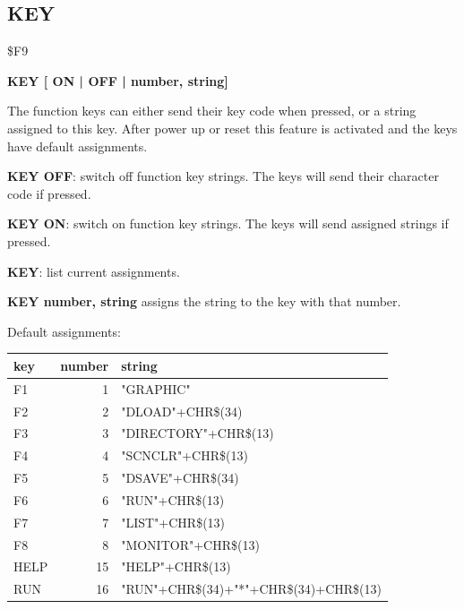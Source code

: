 \subsection{KEY}
\begin{description}[leftmargin=2cm,style=nextline]
\item [Token:] \$F9
\item [Format:] {\bf KEY [ ON | OFF | number, string]}
\item [Usage:] The function keys can either send their key code
               when pressed, or a string assigned to this key.
               After power up or reset this feature is activated
               and the keys have default assignments.

               {\bf KEY OFF}: switch off function key strings.
               The keys will send their character code if pressed.

               {\bf KEY ON}: switch on function key strings.
               The keys will send assigned strings if pressed.

               {\bf KEY}: list current assignments.

               {\bf KEY number, string} assigns the string to
               the key with that number.

               Default assignments:

{\setlength{\tabcolsep}{1mm}
\ttfamily
\begin{tabular}{|l|r|l|}
\hline
  key  & number & string \\
\hline
F1     &  1 & "GRAPHIC" \\
F2     &  2 & "DLOAD"+CHR\$(34) \\
F3     &  3 & "DIRECTORY"+CHR\$(13) \\
F4     &  4 & "SCNCLR"+CHR\$(13) \\
F5     &  5 & "DSAVE"+CHR\$(34) \\
F6     &  6 & "RUN"+CHR\$(13) \\
F7     &  7 & "LIST"+CHR\$(13) \\
F8     &  8 & "MONITOR"+CHR\$(13) \\
HELP   & 15 & "HELP"+CHR\$(13) \\
RUN    & 16 & "RUN"+CHR\$(34)+"*"+CHR\$(34)+CHR\$(13) \\
\hline
\end{tabular}
}


\end{description}

